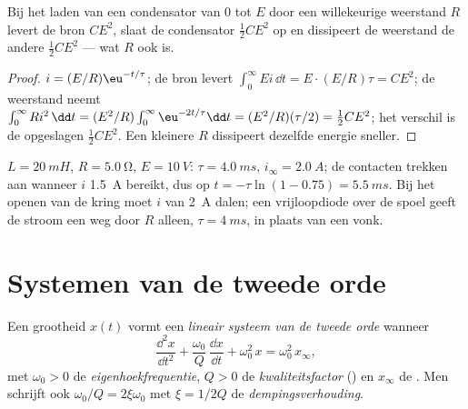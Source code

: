 \begin{proposition}\label{prop:b1:transient-regimes:rcenergy}
Bij het laden van een condensator van $0$ tot $E$ door een willekeurige weerstand $R$ levert de
bron $CE^2$, slaat de condensator $\tfrac12 CE^2$ op en dissipeert de
weerstand de andere $\tfrac12 CE^2$ --- wat $R$ ook is.
\end{proposition}

\begin{proof}
$i = (E/R)\eu^{-t/\tau}$; de bron levert $\int_0^\infty Ei\,\dd t
= E \cdot (E/R)\tau = CE^2$; de weerstand neemt $\int_0^\infty Ri^2\,\dd t
= (E^2/R)\int_0^\infty \eu^{-2t/\tau}\dd t = (E^2/R)(\tau/2) = \tfrac12 CE^2$;
het verschil is de opgeslagen $\tfrac12 CE^2$. Een kleinere $R$ dissipeert
dezelfde energie sneller.
\end{proof}

\begin{example}\label{ex:b1:transient-regimes:relay}
$L = \qty{20}{mH}$, $R = \qty{5.0}{\ohm}$, $E = \qty{10}{V}$: $\tau =
\qty{4.0}{ms}$, $i_\infty = \qty{2.0}{A}$; de contacten trekken aan wanneer
$i$ \qty{1.5}{A} bereikt, dus op $t = -\tau\ln(1 - 0.75) =
\qty{5.5}{ms}$. Bij het openen van de kring moet $i$ van \qty{2}{A} dalen; een
vrijloopdiode over de spoel geeft de stroom een weg door $R$
alleen, $\tau = \qty{4}{ms}$, in plaats van een vonk.
\end{example}

\section{Systemen van de tweede orde}

\begin{definition}\label{def:b1:transient-regimes:secondorder}
Een grootheid $x(t)$ vormt een \emph{lineair systeem van de tweede orde} wanneer
\[
\frac{\dd^2 x}{\dd t^2} + \frac{\omega_0}{Q}\,\frac{\dd x}{\dd t} + \omega_0^2\,x
= \omega_0^2\,x_\infty ,
\]
met $\omega_0 > 0$ de \emph{eigenhoekfrequentie}, $Q > 0$ de
\emph{kwaliteitsfactor} () en $x_\infty$ de .
Men schrijft ook $\omega_0/Q = 2\xi\omega_0$ met $\xi = 1/2Q$ de
\emph{dempingsverhouding}.
\end{definition}

